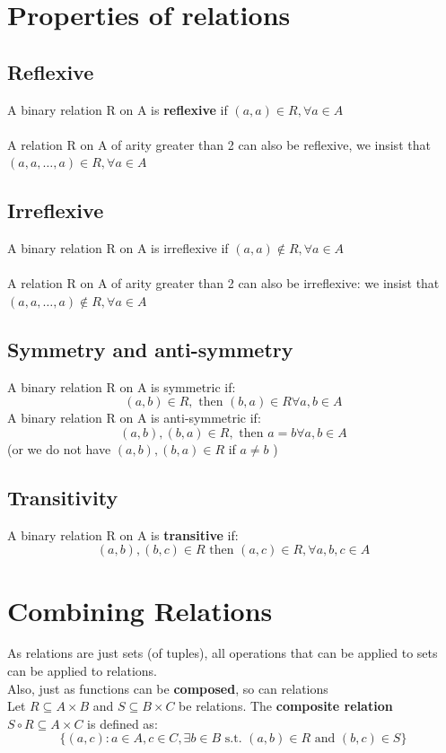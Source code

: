 \documentclass{article}[18pt]
\begin{document}
\section{Properties of relations}
\subsection{Reflexive}
A binary relation R on A is \textbf{reflexive} if $( a , a ) \in R , \forall a \in A$\\
\\
A relation R on A of arity greater than 2 can also be reflexive, we insist that $( a , a , \dots , a ) \in R , \forall a \in A$
\subsection{Irreflexive}
A binary relation R on A is irreflexive if $( a , a ) \notin R , \forall a \in A$\\
\\
A relation R on A of arity greater than 2 can also be irreflexive: we insist that $( a , a , \ldots , a ) \notin R , \forall a \in A$
\subsection{Symmetry and anti-symmetry}
A binary relation R on A is symmetric if:
$$( a , b ) \in R , \text { then } ( b , a ) \in R \forall a , b \in A$$
A binary relation R on A is anti-symmetric if:
$$( a , b ) , ( b , a ) \in R , \text { then } a = b \forall a , b \in A$$
(or we do not have $( a , b ) , ( b , a ) \in R$ if $a \neq b$ )
\subsection{Transitivity}
A binary relation R on A is \textbf{transitive} if:
$$( a , b ) , ( b , c ) \in R \text { then } ( a , c ) \in R , \forall a , b , c \in A$$
\section{Combining Relations}
As relations are just sets (of tuples), all operations that can be applied to sets can be applied to relations.\\
Also, just as functions can be \textbf{composed}, so can relations\\
Let $R \subseteq A \times B$ and $S \subseteq B \times C$ be relations. The \textbf{composite relation} $S \circ R \subseteq A \times C$ is defined as:
$$\{ ( a , c ) : a \in A , c \in C , \exists b \in B \text { s.t. } ( a , b ) \in R \text { and } ( b , c ) \in S \}$$
\end{document}
